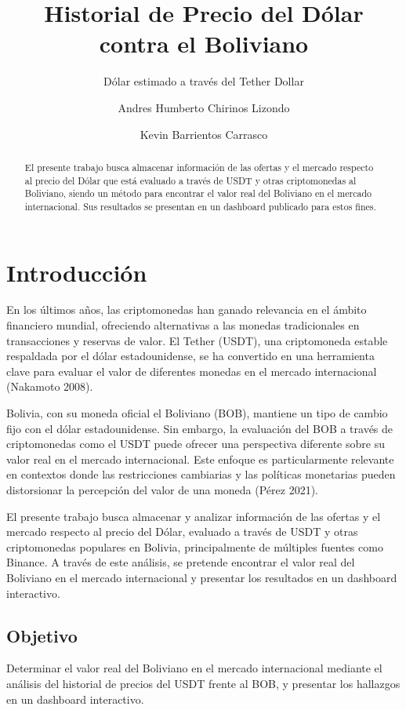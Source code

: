 \documentclass[
  letterpaper,
  DIV=11,
  numbers=noendperiod]{scrartcl}
\title{Historial de Precio del Dólar contra el Boliviano}
\subtitle{Dólar estimado a través del Tether Dollar}
\author{Andres Humberto Chirinos Lizondo \and Kevin Barrientos Carrasco}
\date{}
\begin{document}
\maketitle
\begin{abstract}
El presente trabajo busca almacenar información de las ofertas y el
mercado respecto al precio del Dólar que está evaluado a través de USDT
y otras criptomonedas al Boliviano, siendo un método para encontrar el
valor real del Boliviano en el mercado internacional. Sus resultados se
presentan en un dashboard publicado para estos fines.
\end{abstract}


\section{Introducción}\label{introducciuxf3n}

En los últimos años, las criptomonedas han ganado relevancia en el
ámbito financiero mundial, ofreciendo alternativas a las monedas
tradicionales en transacciones y reservas de valor. El Tether (USDT),
una criptomoneda estable respaldada por el dólar estadounidense, se ha
convertido en una herramienta clave para evaluar el valor de diferentes
monedas en el mercado internacional (Nakamoto 2008).

Bolivia, con su moneda oficial el Boliviano (BOB), mantiene un tipo de
cambio fijo con el dólar estadounidense. Sin embargo, la evaluación del
BOB a través de criptomonedas como el USDT puede ofrecer una perspectiva
diferente sobre su valor real en el mercado internacional. Este enfoque
es particularmente relevante en contextos donde las restricciones
cambiarias y las políticas monetarias pueden distorsionar la percepción
del valor de una moneda (Pérez 2021).

El presente trabajo busca almacenar y analizar información de las
ofertas y el mercado respecto al precio del Dólar, evaluado a través de
USDT y otras criptomonedas populares en Bolivia, principalmente de
múltiples fuentes como Binance. A través de este análisis, se pretende
encontrar el valor real del Boliviano en el mercado internacional y
presentar los resultados en un dashboard interactivo.

\subsection{Objetivo}\label{objetivo}

Determinar el valor real del Boliviano en el mercado internacional
mediante el análisis del historial de precios del USDT frente al BOB, y
presentar los hallazgos en un dashboard interactivo.
\end{document}
